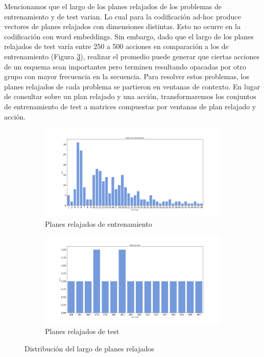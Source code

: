 Mencionamos que el largo de los planes relajados de los problemas de
entrenamiento y de test varian. Lo cual para la codificación ad-hoc produce
vectores de planes relajados con dimensiones distintas. Esto no ocurre en la
codificación con word embeddings. Sin embargo, dado que el largo de los planes
relajados de test varía entre 250 a 500 acciones en comparación a los de
entrenamiento (Figura \ref{fig:plan-length-distplot}), realizar el promedio
puede generar que ciertas acciones de un esquema sean importantes pero terminen
resultando opacadas por otro grupo con mayor frecuencia en la secuencia. Para
resolver estos problemas, los planes relajados de cada problema se partieron en
ventanas de contexto. En lugar de consultar sobre un plan relajado y una acción,
transformaremos los conjuntos de entrenamiento de test a matrices compuestas por
ventanas de plan relajado y acción.

\begin{figure}[t!]
    \begin{subfigure}[b]{\textwidth}
        \centering
        \includegraphics[width=\linewidth]{figures/plan_length_distplot_train.png}
        \caption{Planes relajados de entrenamiento}
        \label{fig:plan-length-distplot-train}
    \end{subfigure}
    \begin{subfigure}[b]{\textwidth}
        \centering
        \includegraphics[width=\linewidth]{figures/plan_length_distplot_test.png}
        \caption{Planes relajados de test}
        \label{fig:plan-length-distplot-test}
    \end{subfigure}
    \caption{Distribución del largo de planes relajados}
    \label{fig:plan-length-distplot}
\end{figure}

